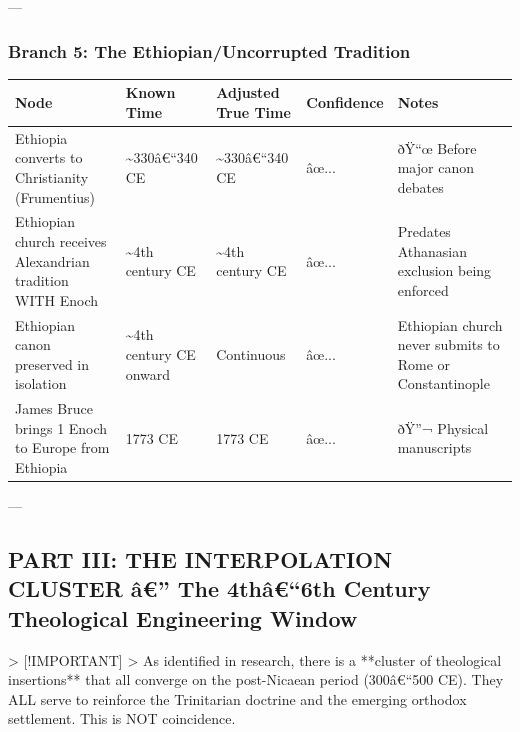 \documentclass[aps,prd,11pt,onecolumn,superscriptaddress,nofootinbib,floatfix]{revtex4-2}
\begin{document}
---


\subsubsection{Branch 5: The Ethiopian/Uncorrupted Tradition}


\begin{table}[h!]
\centering
\begin{tabular}{p{3cm}p{3cm}p{3cm}p{3cm}p{3cm}}
\hline
Node & Known Time & Adjusted True Time & Confidence & Notes \\
\hline
Ethiopia converts to Christianity (Frumentius) & \textasciitilde{}330â€``340 CE & \textasciitilde{}330â€``340 CE & âœ... & ðŸ``œ Before major canon debates \\
Ethiopian church receives Alexandrian tradition WITH Enoch & \textasciitilde{}4th century CE & \textasciitilde{}4th century CE & âœ... & Predates Athanasian exclusion being enforced \\
Ethiopian canon preserved in isolation & \textasciitilde{}4th century CE onward & Continuous & âœ... & Ethiopian church never submits to Rome or Constantinople \\
James Bruce brings 1 Enoch to Europe from Ethiopia & 1773 CE & 1773 CE & âœ... & ðŸ''¬ Physical manuscripts \\
\hline
\end{tabular}
\end{table}



---


\subsection{PART III: THE INTERPOLATION CLUSTER â€'' The 4thâ€``6th Century Theological Engineering Window}


> [!IMPORTANT]
> As identified in research, there is a **cluster of theological insertions** that all converge on the post-Nicaean period (300â€``500 CE). They ALL serve to reinforce the Trinitarian doctrine and the emerging orthodox settlement. This is NOT coincidence.
\end{document}

